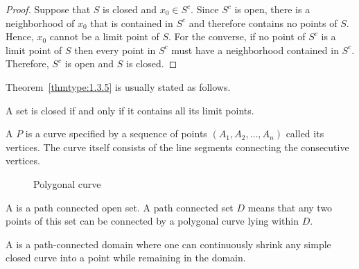 \begin{proof}
Suppose that $S$ is closed and $x_0\in S^c$. Since $S^c$ is open,
there is a neighborhood of $x_0$ that is contained in $S^c$ and
therefore contains no points of $S$. Hence, $x_0$ cannot be a limit
point of $S$. For the converse, if no point of $S^c$ is a limit point
of $S$ then every point in $S^c$ must have a neighborhood contained
in $S^c$. Therefore, $S^c$ is open and $S$ is closed.
\end{proof}

Theorem~\ref{thmtype:1.3.5} is usually stated as follows.

\begin{corollary}\label{thmtype:1.3.6}  A set is closed if and only if it
contains all its limit points$.$
\end{corollary}



A  $P$ is a curve specified by a sequence of points 
$(A_{1},A_{2},\dots ,A_{n})$ called its vertices. The curve itself consists of 
the line segments connecting the consecutive vertices. 

\begin{figure}[h]
\centering

\caption{Polygonal curve}
\end{figure}


\begin{df}
A   is a  path connected open set. A path connected set $D$ means that 
any 
two points of this set can be connected by a polygonal curve lying within
$D$.  
\end{df}




\begin{df}
A  is a path-connected domain where one can continuously shrink any simple closed curve into a point while remaining in the domain.
\end{df}

